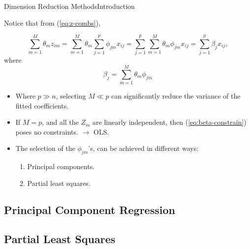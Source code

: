 \begin{frame}{Dimension Reduction Methods}{Introduction}

Notice that from (\ref{eq:z-combs}), \pause 

\begin{equation*}
    \sum_{m=1}^M \theta_m z_{im} = \sum_{m=1}^M \theta_m \sum_{j=1}^p \phi_{jm} x_{ij} = \sum_{j=1}^p \sum_{m=1}^M \theta_m \phi_{jm} x_{ij} = \sum_{j=1}^p \beta_j x_{ij}, 
\end{equation*} \pause 
    where
    \begin{equation}\label{eq:beta-constrain}
        \beta_j = \sum_{m=1}^M \theta_m \phi_{jm}
    \end{equation} \pause 

\begin{itemize}

    \item Where $p \gg n$, selecting $M \ll p$ can significantly reduce the variance of the fitted coeﬃcients. \pause 

    \item If $M = p$, and all the $Z_m$ are linearly independent, then (\ref{eq:beta-constrain}) poses no constraints. $\rightarrow$ OLS. \pause 

    \item The selection of the $\phi_{jm}$'s, can be achieved in diﬀerent ways: \pause 

    \begin{enumerate}
        \item Principal components. \pause 
        \item Partial least squares. 
    \end{enumerate}
\end{itemize}

    
\end{frame}

\subsection{Principal Component Regression}


\subsection{Partial Least Squares}
